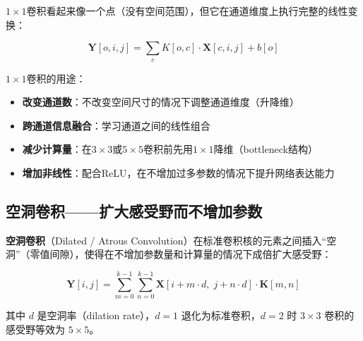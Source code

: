 $1\times1$卷积看起来像一个点（没有空间范围），但它在通道维度上执行完整的线性变换：

\[
\mathbf{Y}[o, i, j] = \sum_{c} K[o, c] \cdot \mathbf{X}[c, i, j] + b[o]
\]

$1\times1$卷积的用途：
\begin{itemize}
    \item \textbf{改变通道数}：不改变空间尺寸的情况下调整通道维度（升降维）
    \item \textbf{跨通道信息融合}：学习通道之间的线性组合
    \item \textbf{减少计算量}：在$3\times3$或$5\times5$卷积前先用$1\times1$降维（bottleneck结构）
    \item \textbf{增加非线性}：配合ReLU，在不增加过多参数的情况下提升网络表达能力
\end{itemize}

\subsection{空洞卷积——扩大感受野而不增加参数}

\textbf{空洞卷积}（Dilated / Atrous Convolution）在标准卷积核的元素之间插入``空洞''（零值间隙），使得在不增加参数量和计算量的情况下成倍扩大感受野：

\[
\mathbf{Y}[i, j] = \sum_{m=0}^{k-1}\sum_{n=0}^{k-1} \mathbf{X}[i + m\cdot d,\; j + n\cdot d] \cdot \mathbf{K}[m, n]
\]

其中 $d$ 是空洞率（dilation rate），$d=1$ 退化为标准卷积，$d=2$ 时 $3\times3$ 卷积的感受野等效为 $5\times5$。

